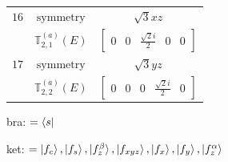 \documentclass[fleqn,8pt,landscape]{jsarticle}
\begin{document}
\begin{longtable}{ccc}
$ 16 $ & $ \text{symmetry} $ & $ \sqrt{3} x z $ \\
$  $ & $ \mathbb{T}_{2,1}^{(a)}(E) $ & $ \begin{bmatrix} 0 & 0 & \frac{\sqrt{2} i}{2} & 0 & 0 \end{bmatrix} $ \\ \hline
$ 17 $ & $ \text{symmetry} $ & $ \sqrt{3} y z $ \\
$  $ & $ \mathbb{T}_{2,2}^{(a)}(E) $ & $ \begin{bmatrix} 0 & 0 & 0 & \frac{\sqrt{2} i}{2} & 0 \end{bmatrix} $ \\ \hline
\end{longtable}
bra: $=\bra{s}$

\noindent
ket: $=\ket{f_{c}}, \ket{f_{s}}, \ket{f_{z}^{\beta}}, \ket{f_{xyz}}, \ket{f_{x}}, \ket{f_{y}}, \ket{f_{z}^{\alpha}}$
\renewcommand{\arraystretch}{1.6}
\end{document}
